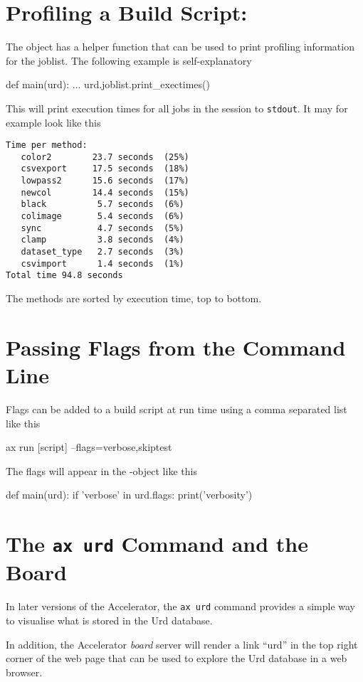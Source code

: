 \section{Profiling a Build Script:  }
The  object has a helper function that can be used to
print profiling information for the joblist.  The following example is
self-explanatory
\begin{python}
def main(urd):
    ...
    urd.joblist.print_exectimes()
\end{python}
This will print execution times for all jobs in the session
to \texttt{stdout}.  It may for example look like this
\begin{verbatim}
Time per method:
   color2        23.7 seconds  (25%)
   csvexport     17.5 seconds  (18%)
   lowpass2      15.6 seconds  (17%)
   newcol        14.4 seconds  (15%)
   black          5.7 seconds  (6%)
   colimage       5.4 seconds  (6%)
   sync           4.7 seconds  (5%)
   clamp          3.8 seconds  (4%)
   dataset_type   2.7 seconds  (3%)
   csvimport      1.4 seconds  (1%)
Total time 94.8 seconds
\end{verbatim}
The methods are sorted by execution time, top to bottom.





\section{Passing Flags from the Command Line}
Flags can be added to a build script at run time using a comma
separated list like this
\begin{python}
ax run [script] --flags=verbose,skiptest
\end{python}
The flags will appear in the -object like this
\begin{python}
def main(urd):
    if 'verbose' in urd.flags:
        print('verbosity')
\end{python}





\section{The \texttt{ax urd} Command and the Board}
In later versions of the Accelerator, the \texttt{ax urd} command
provides a simple way to visualise what is stored in the Urd database.

In addition, the Accelerator \textsl{board} server will render a link
``urd'' in the top right corner of the web page that can be used to
explore the Urd database in a web browser.

